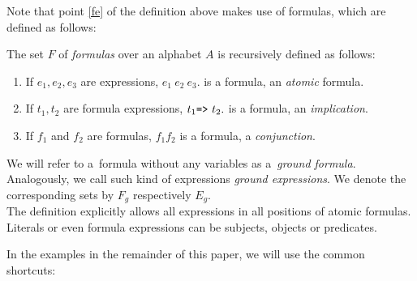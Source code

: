 Note that point \ref{fe} of the definition above makes use of formulas, which are defined as follows:

\begin{definition}
    \label{formula}
    The set $F$ of \textit{\nthree formulas} over an alphabet $A$ is recursively defined as follows:
    \begin{enumerate}  
      \item \label{1} If $e_1, e_2, e_3$ are expressions, $e_1~ e_2~ e_3$. is a formula, an \textit{atomic} formula.
      \item \label{2} If $t_1, t_2$ are formula expressions, $t_{1} \verb!=>!~t_{2}.$ is a formula, an \textit{implication}.
      \item \label{n} If $f_1$ and $f_2$ are formulas, $f_1 f_2$ is a formula, a \textit{conjunction}.
    \end{enumerate}
\end{definition}

We will refer to a~formula without any variables as a~\textit{ground formula}.
Analogously, we call such kind of expressions \textit{ground expressions}.
We denote the corresponding sets by $F_g$ respectively $E_g$.\\
The definition explicitly allows all expressions in all positions of atomic formulas. 
Literals or even formula expressions can be subjects, objects or predicates.

%


In the examples in the remainder of this paper, we will use the common \rdf shortcuts:

